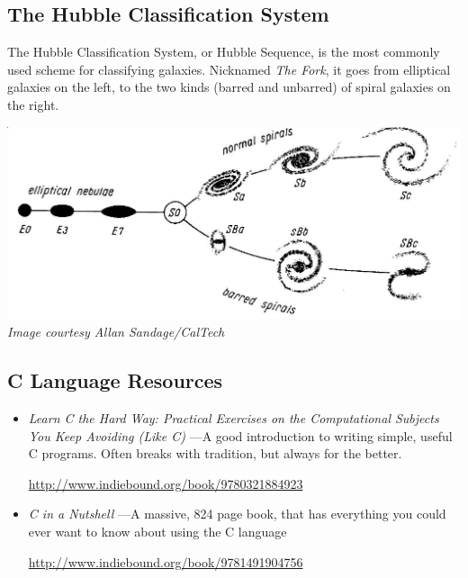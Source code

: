 \documentclass[12pt,twoside]{reedthesis}
\begin{document}
\begin{appendices}
    \chapter{}
        \section{The Hubble Classification System} \label{hubble-fork}
            The Hubble Classification System, or Hubble Sequence, is the most commonly used scheme for classifying galaxies. Nicknamed \emph{The Fork}, it goes from elliptical galaxies on the left, to the two kinds (barred and unbarred) of spiral galaxies on the right.

            \includegraphics[width=\textwidth]{imgs/hubble_seq}
            \emph{Image courtesy Allan Sandage/CalTech}


        \section{C Language Resources} \label{C-resources}
        \begin{itemize}
            \item \emph{Learn C the Hard Way: Practical Exercises on the Computational Subjects You Keep Avoiding (Like C)}
            ---A good introduction to writing simple, useful C programs. Often breaks with tradition, but always for the better.

            \url{http://www.indiebound.org/book/9780321884923}

            \item \emph{C in a Nutshell}
            ---A massive, 824 page book, that has everything you could ever want to know about using the C language

            \url{http://www.indiebound.org/book/9781491904756}


\end{itemize}
\end{appendices}
\end{document}

